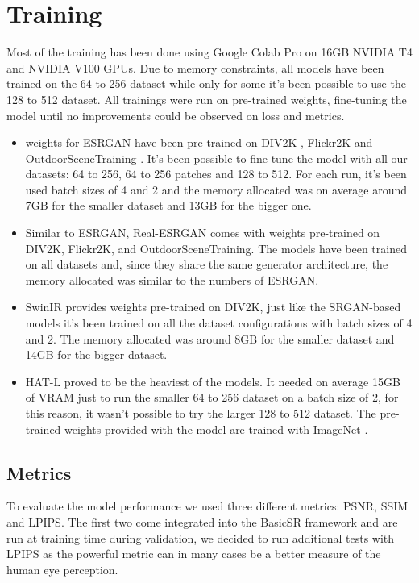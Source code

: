 \newpage
\chapter{Training}
\label{cha:Training}

Most of the training has been done using Google Colab Pro on 16GB NVIDIA T4 and NVIDIA V100 GPUs. Due to memory constraints, all models have been trained on the 64 to 256 dataset while only for some it's been possible to use the 128 to 512 dataset.
All trainings were run on pre-trained weights, fine-tuning the model until no improvements could be observed on loss and metrics.

\begin{itemize}
  \item weights for ESRGAN have been pre-trained on  DIV2K \cite{Agustsson_2017_CVPR_Workshops}, Flickr2K \cite{Lim_2017_CVPR_Workshops} and OutdoorSceneTraining \cite{wang2018recovering}. It's been possible to fine-tune the model with all our datasets: 64 to 256, 64 to 256 patches and 128 to 512. For each run, it's been used batch sizes of 4 and 2 and the memory allocated was on average around 7GB for the smaller dataset and 13GB for the bigger one.
  \item Similar to ESRGAN, Real-ESRGAN comes with weights pre-trained on DIV2K, Flickr2K, and OutdoorSceneTraining. The models have been trained on all datasets and, since they share the same generator architecture, the memory allocated was similar to the numbers of ESRGAN.
  \item SwinIR provides weights pre-trained on DIV2K, just like the SRGAN-based models it's been trained on all the dataset configurations with batch sizes of 4 and 2. The memory allocated was around 8GB for the smaller dataset and 14GB for the bigger dataset.
  \item HAT-L proved to be the heaviest of the models. It needed on average 15GB of VRAM just to run the smaller 64 to 256 dataset on a batch size of 2, for this reason, it wasn't possible to try the larger 128 to 512 dataset. The pre-trained weights provided with the model are trained with ImageNet \cite{deng2009imagenet}.
\end{itemize}

\section{Metrics}
\label{sec:metrics}

To evaluate the model performance we used three different metrics: PSNR, SSIM and LPIPS. The first two come integrated into the BasicSR framework and are run at training time during validation, we decided to run additional tests with LPIPS as the powerful metric can in many cases be a better measure of the human eye perception.

